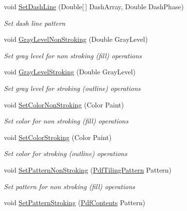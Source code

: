 \begin{DoxyCompactItemize}
void \hyperlink{class_pdf_file_writer_1_1_pdf_contents_a28f70c2cdaac9a2c5b03e6af5c220b3b}{Set\+Dash\+Line} (Double\mbox{[}$\,$\mbox{]} Dash\+Array, Double Dash\+Phase)
\begin{DoxyCompactList}\small\item\em Set dash line pattern \end{DoxyCompactList}\item 
void \hyperlink{class_pdf_file_writer_1_1_pdf_contents_ac046300b85f45ef35bd2878fb5d846b0}{Gray\+Level\+Non\+Stroking} (Double Gray\+Level)
\begin{DoxyCompactList}\small\item\em Set gray level for non stroking (fill) operations \end{DoxyCompactList}\item 
void \hyperlink{class_pdf_file_writer_1_1_pdf_contents_a569ae0078303d457c9ae25698cd1fd34}{Gray\+Level\+Stroking} (Double Gray\+Level)
\begin{DoxyCompactList}\small\item\em Set gray level for stroking (outline) operations \end{DoxyCompactList}\item 
void \hyperlink{class_pdf_file_writer_1_1_pdf_contents_adbe11294b560149805c6a6ccd351f52f}{Set\+Color\+Non\+Stroking} (Color Paint)
\begin{DoxyCompactList}\small\item\em Set color for non stroking (fill) operations \end{DoxyCompactList}\item 
void \hyperlink{class_pdf_file_writer_1_1_pdf_contents_a76941e13717e7a03f2de4ea582dfe0da}{Set\+Color\+Stroking} (Color Paint)
\begin{DoxyCompactList}\small\item\em Set color for stroking (outline) operations \end{DoxyCompactList}\item 
void \hyperlink{class_pdf_file_writer_1_1_pdf_contents_aa8136a0b038efd52e5a173a13829c7cf}{Set\+Pattern\+Non\+Stroking} (\hyperlink{class_pdf_file_writer_1_1_pdf_tiling_pattern}{Pdf\+Tiling\+Pattern} Pattern)
\begin{DoxyCompactList}\small\item\em Set pattern for non stroking (fill) operations \end{DoxyCompactList}\item 
void \hyperlink{class_pdf_file_writer_1_1_pdf_contents_a23ae5ebfc5f3928369566fcfb261bfc7}{Set\+Pattern\+Stroking} (\hyperlink{class_pdf_file_writer_1_1_pdf_contents}{Pdf\+Contents} Pattern)

\end{DoxyCompactItemize}
